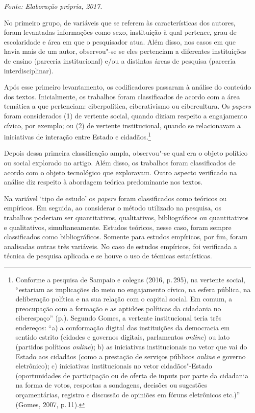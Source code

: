 \begin{center}
{\footnotesize\emph{Fonte: Elaboração própria, 2017.}}
\end{center}

No primeiro grupo, de variáveis que se referem às características dos
autores, foram levantadas informações como sexo, instituição à qual
pertence, grau de escolaridade e área em que o pesquisador atua.
Além disso, nos casos em que havia mais de um autor, observou"-se se
eles pertenciam a diferentes instituições de ensino (parceria
institucional) e/ou a distintas áreas de pesquisa (parceria
interdisciplinar).

Após esse primeiro levantamento, os codificadores passaram à análise do
conteúdo dos textos. Inicialmente, os trabalhos foram classificados de
acordo com a área temática a que pertenciam: ciberpolítica,
ciberativismo ou cibercultura. Os \emph{papers} foram considerados (1)
de vertente social, quando diziam respeito a engajamento cívico, por
exemplo; ou (2) de vertente institucional, quando se relacionavam a
iniciativas de interação entre Estado e cidadãos.\footnote{Conforme a
  pesquisa de Sampaio e colegas (2016, p.\,295), na vertente social,
  ``estariam as implicações do meio no engajamento cívico, na esfera
  pública, na deliberação política e na sua relação com o capital
  social. Em comum, a preocupação com a formação e as aptidões políticas
  da cidadania no ciberespaço'' (p.). Segundo Gomes, a vertente
  institucional teria três endereços: ``a) a conformação digital das
  instituições da democracia em sentido estrito (cidades e governos
  digitais, parlamentos \emph{online}) ou lato (partidos políticos \emph{online});
  b) as iniciativas institucionais no vetor que vai do Estado aos
  cidadãos (como a prestação de serviços públicos \emph{online} e governo
  eletrônico); c) iniciativas institucionais no vetor cidadãos"-Estado
  (oportunidades de participação ou de oferta de inputs por parte da
  cidadania na forma de votos, respostas a sondagens, decisões ou
  sugestões orçamentárias, registro e discussão de opiniões em fóruns
  eletrônicos etc.)'' (Gomes, 2007, p.\,11).}

Depois dessa primeira classificação ampla, observou"-se qual era o objeto
político ou social explorado no artigo. Além disso, os trabalhos foram
classificados de acordo com o objeto tecnológico que exploravam. Outro
aspecto verificado na análise diz respeito à abordagem teórica
predominante nos textos.

Na variável `tipo de estudo' os \emph{papers} foram classificados como
teóricos ou empíricos. Em seguida, ao considerar o método utilizado na
pesquisa, os trabalhos poderiam ser quantitativos, qualitativos,
bibliográficos ou quantitativos e qualitativos, simultaneamente. Estudos
teóricos, nesse caso, foram sempre classificados como bibliográficos.
Somente para estudos empíricos, por fim, foram analisadas outras três
variáveis. No caso de estudos empíricos, foi verificada a técnica de
pesquisa aplicada e se houve o uso de técnicas estatísticas.

